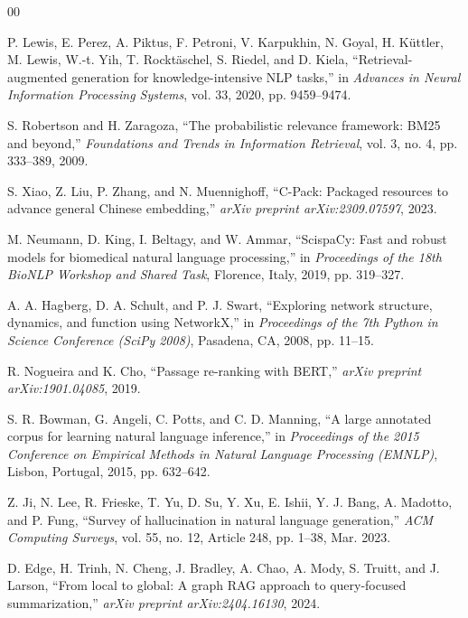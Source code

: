 \documentclass[conference]{IEEEtran}
\begin{document}

\begin{thebibliography}{00}

P. Lewis, E. Perez, A. Piktus, F. Petroni, V. Karpukhin, N. Goyal, H. K\"{u}ttler, M. Lewis, W.-t. Yih, T. Rockt\"{a}schel, S. Riedel, and D. Kiela, ``Retrieval-augmented generation for knowledge-intensive NLP tasks,'' in \emph{Advances in Neural Information Processing Systems}, vol. 33, 2020, pp. 9459--9474.

S. Robertson and H. Zaragoza, ``The probabilistic relevance framework: BM25 and beyond,'' \emph{Foundations and Trends in Information Retrieval}, vol. 3, no. 4, pp. 333--389, 2009.

S. Xiao, Z. Liu, P. Zhang, and N. Muennighoff, ``C-Pack: Packaged resources to advance general Chinese embedding,'' \emph{arXiv preprint arXiv:2309.07597}, 2023.

M. Neumann, D. King, I. Beltagy, and W. Ammar, ``ScispaCy: Fast and robust models for biomedical natural language processing,'' in \emph{Proceedings of the 18th BioNLP Workshop and Shared Task}, Florence, Italy, 2019, pp. 319--327.

A. A. Hagberg, D. A. Schult, and P. J. Swart, ``Exploring network structure, dynamics, and function using NetworkX,'' in \emph{Proceedings of the 7th Python in Science Conference (SciPy 2008)}, Pasadena, CA, 2008, pp. 11--15.

R. Nogueira and K. Cho, ``Passage re-ranking with BERT,'' \emph{arXiv preprint arXiv:1901.04085}, 2019.

S. R. Bowman, G. Angeli, C. Potts, and C. D. Manning, ``A large annotated corpus for learning natural language inference,'' in \emph{Proceedings of the 2015 Conference on Empirical Methods in Natural Language Processing (EMNLP)}, Lisbon, Portugal, 2015, pp. 632--642.

Z. Ji, N. Lee, R. Frieske, T. Yu, D. Su, Y. Xu, E. Ishii, Y. J. Bang, A. Madotto, and P. Fung, ``Survey of hallucination in natural language generation,'' \emph{ACM Computing Surveys}, vol. 55, no. 12, Article 248, pp. 1--38, Mar. 2023.

D. Edge, H. Trinh, N. Cheng, J. Bradley, A. Chao, A. Mody, S. Truitt, and J. Larson, ``From local to global: A graph RAG approach to query-focused summarization,'' \emph{arXiv preprint arXiv:2404.16130}, 2024.


\end{thebibliography}
\end{document}
